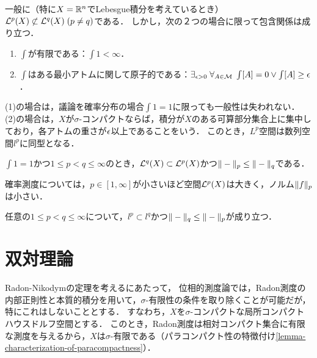 \documentclass[uplatex,dvipdfmx]{jsreport}
\begin{document}
\begin{discussion}
    一般に（特に$X=\mathbb{R}^n$でLebesgue積分を考えているとき）$\mathcal{L}^p(X)\not\subset\mathcal{L}^q(X)\;(p\ne q)$である．
    しかし，次の２つの場合に限って包含関係は成り立つ．
    \begin{enumerate}
        \item $\int$が有限である：$\int 1<\infty$．
        \item $\int$はある最小アトムに関して原子的である：$\exists_{\epsilon>0}\;\forall_{A\in\mathcal{M}}\;\int[A]=0\lor\int[A]\ge\epsilon$．
    \end{enumerate}
    (1)の場合は，議論を確率分布の場合$\int 1=1$に限っても一般性は失われない．
    (2)の場合は，$X$が$\sigma$-コンパクトならば，積分が$X$のある可算部分集合上に集中しており，各アトムの重さが$\epsilon$以上であることをいう．
    このとき，$L^p$空間は数列空間$l^p$に同型となる．
\end{discussion}

\begin{corollary}
    $\int 1=1$かつ$1\le p<q\le\infty$のとき，$\mathcal{L}^q(X)\subset\mathcal{L}^p(X)$かつ$\|-\|_p\le\|-\|_q$である．
\end{corollary}
\begin{remarks}[確率空間上のLebesgue空間]
    確率測度については，$p\in[1,\infty]$が小さいほど空間$\mathcal{L}^p(X)$は大きく，ノルム$\|f\|_p$は小さい．
\end{remarks}

\begin{corollary}
    任意の$1\le p<q\le\infty$について，$l^p\subset l^q$かつ$\|-\|_q\le\|-\|_p$が成り立つ．
\end{corollary}

\section{双対理論}

\begin{tcolorbox}[colframe=ForestGreen, colback=ForestGreen!10!white,breakable,colbacktitle=ForestGreen!40!white,coltitle=black,fonttitle=\bfseries\sffamily,
title=]
    Radon-Nikodymの定理を考えるにあたって，
    位相的測度論では，Radon測度の内部正則性と本質的積分を用いて，$\sigma$-有限性の条件を取り除くことが可能だが，特にこれはしないこととする．
    すなわち，$X$を$\sigma$-コンパクトな局所コンパクトハウスドルフ空間とする．
    このとき，Radon測度は相対コンパクト集合に有限な測度を与えるから，$X$は$\sigma$-有限である（パラコンパクト性の特徴付け\ref{lemma-characterization-of-paracompactness}）．
\end{tcolorbox}
\end{document}

